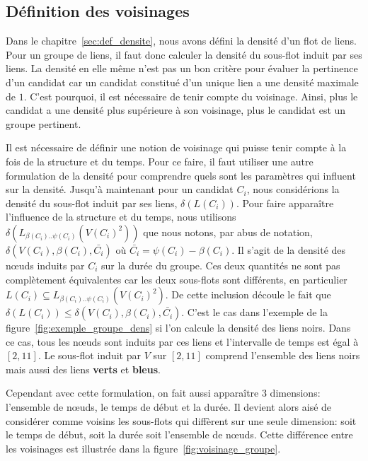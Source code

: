 \subsection{Définition des voisinages}
Dans le chapitre~\ref{sec:def_densite}, nous avons défini la densité d'un flot de liens.
Pour un groupe de liens, il faut donc calculer la densité du sous-flot induit par ses liens.
La densité en elle même n'est pas un bon critère pour évaluer la pertinence d'un candidat car un candidat constitué d'un unique lien a une densité maximale de $1$.
C'est pourquoi, il est nécessaire de tenir compte du voisinage.
Ainsi, plus le candidat a une densité plus supérieure à son voisinage, plus le candidat est un groupe pertinent.

Il est nécessaire de définir une notion de voisinage qui puisse tenir compte à la fois de la structure et du temps.
Pour ce faire, il faut utiliser une autre formulation de la densité pour comprendre quels sont les paramètres qui influent sur la densité.
Jusqu'à maintenant pour un candidat $C_i$, nous considérions la densité du sous-flot induit par ses liens, $\delta(L(C_i))$.
Pour faire apparaître l'influence de la structure et du temps, nous utilisons $\delta(L_{\beta(C_i)..\psi(C_i)}(V(C_i)^2))$ que nous notons, par abus de notation, $\delta(V(C_i),\beta(C_i), \bar{C_i})$ où $\bar{C_i} = \psi(C_i)-\beta(C_i)$.
Il s'agit de la densité des n\oe{}uds induits par $C_i$ sur la durée du groupe.
Ces deux quantités ne sont pas complètement équivalentes car les deux sous-flots sont différents, en particulier $L(C_i) \subseteq L_{\beta(C_i)..\psi(C_i)}(V(C_i)^2)$.
De cette inclusion découle le fait que $\delta(L(C_i)) \leq \delta(V(C_i),\beta(C_i), \bar{C_i})$.
C'est le cas dans l'exemple de la figure~\ref{fig:exemple_groupe_dens} si l'on calcule la densité des liens noirs.
Dans ce cas, tous les n\oe{}uds sont induits par ces liens et l'intervalle de temps est égal à $[2,11]$.
Le sous-flot induit par $V$ sur $[2,11]$ comprend l'ensemble des liens noirs mais aussi des liens \textcolor{vert_turquoise}{\textbf{verts}} et \textcolor{bleu_window}{\textbf{bleus}}.


Cependant avec cette formulation, on fait aussi apparaître 3 dimensions: l'ensemble de n\oe{}uds, le temps de début et la durée.
Il devient alors aisé de considérer comme voisins les sous-flots qui diffèrent sur une seule dimension: soit le temps de début, soit la durée soit l'ensemble de n\oe{}uds.
Cette différence entre les voisinages est illustrée dans la figure~\ref{fig:voisinage_groupe}.

